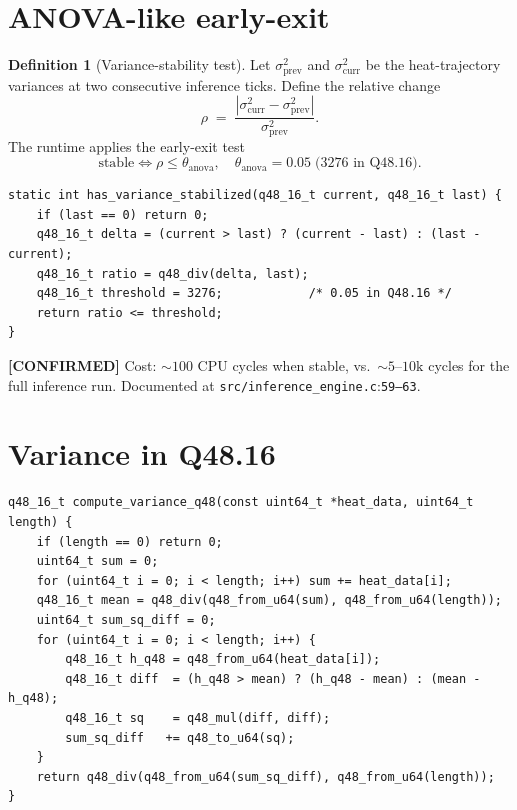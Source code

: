 \documentclass[11pt,letterpaper,openany]{book}
\theoremstyle{definition}
\newtheorem{definition}{Definition}[chapter]
\theoremstyle{plain}
\newcommand{\confirmed}{\textcolor{green!50!black}{\textbf{[CONFIRMED]}}\xspace}
\newcommand{\sourceref}[2]{\texttt{#1}:\texttt{#2}}
\begin{document}
\section{ANOVA-like early-exit}

\begin{definition}[Variance-stability test]\label{def:anova-exit}
Let $\sigma^2_{\mathrm{prev}}$ and $\sigma^2_{\mathrm{curr}}$ be the
heat-trajectory variances at two consecutive inference ticks. Define the
relative change
\[
  \rho \;=\; \frac{|\sigma^2_{\mathrm{curr}} - \sigma^2_{\mathrm{prev}}|}{\sigma^2_{\mathrm{prev}}}.
\]
The runtime applies the early-exit test
\[
  \text{stable} \iff \rho \le \theta_{\mathrm{anova}}, \quad
  \theta_{\mathrm{anova}} = 0.05 \;\text{(}3276\text{ in Q48.16)}.
\]
\end{definition}

\begin{lstlisting}[caption={Early-exit check (\texttt{src/inference\_engine.c}:65--93).}]
static int has_variance_stabilized(q48_16_t current, q48_16_t last) {
    if (last == 0) return 0;
    q48_16_t delta = (current > last) ? (current - last) : (last - current);
    q48_16_t ratio = q48_div(delta, last);
    q48_16_t threshold = 3276;            /* 0.05 in Q48.16 */
    return ratio <= threshold;
}
\end{lstlisting}

\confirmed Cost: ${\sim}100$ CPU cycles when stable, vs.\ ${\sim}5\text{--}10\mathrm{k}$
cycles for the full inference run. Documented at
\sourceref{src/inference\_engine.c}{59--63}.

\section{Variance in Q48.16}

\begin{lstlisting}[caption={Variance accumulator
  (\texttt{src/inference\_engine.c}:191--217).}]
q48_16_t compute_variance_q48(const uint64_t *heat_data, uint64_t length) {
    if (length == 0) return 0;
    uint64_t sum = 0;
    for (uint64_t i = 0; i < length; i++) sum += heat_data[i];
    q48_16_t mean = q48_div(q48_from_u64(sum), q48_from_u64(length));
    uint64_t sum_sq_diff = 0;
    for (uint64_t i = 0; i < length; i++) {
        q48_16_t h_q48 = q48_from_u64(heat_data[i]);
        q48_16_t diff  = (h_q48 > mean) ? (h_q48 - mean) : (mean - h_q48);
        q48_16_t sq    = q48_mul(diff, diff);
        sum_sq_diff   += q48_to_u64(sq);
    }
    return q48_div(q48_from_u64(sum_sq_diff), q48_from_u64(length));
}
\end{lstlisting}
\end{document}
